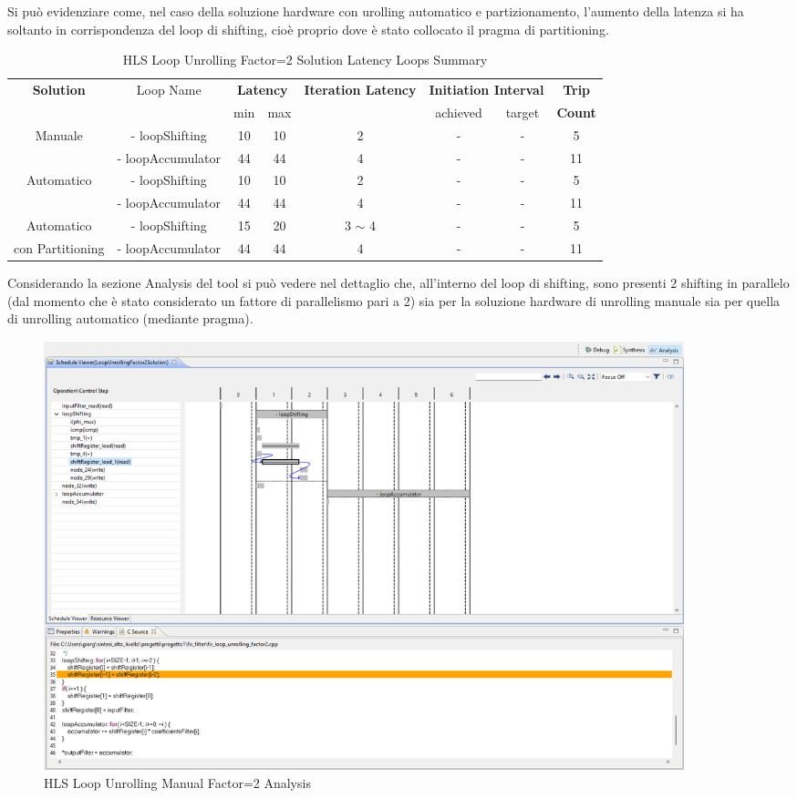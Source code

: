 Si può evidenziare come, nel caso della soluzione hardware con urolling automatico e partizionamento, l'aumento della latenza si ha soltanto in corrispondenza del loop di shifting, cioè proprio dove è stato collocato il pragma di partitioning.

\begin{table}[H]
    \centering
    \begin{tabular}{|c|c|c|c|c|c|c|c|}
        \hline
        \multicolumn{1}{|c|}{\textbf{Solution}} & \multicolumn{1}{|c|}{Loop Name} & \multicolumn{2}{|c|}{\textbf{Latency}} & \multicolumn{1}{c|}{\textbf{Iteration Latency}} & \multicolumn{2}{c|}{\textbf{Initiation Interval}} & \multicolumn{1}{c|}{\textbf{Trip}}  \\
        &  & min & max & & achieved & target & \textbf{Count} \\
        \hline
        Manuale & - loopShifting & 10 & 10 & 2 & - & - & 5 \\
        & - loopAccumulator & 44 & 44 & 4 & - & - & 11 \\
        \hline
        Automatico & - loopShifting & 10 & 10 & 2 & - & - & 5 \\
        & - loopAccumulator & 44 & 44 & 4 & - & - & 11 \\
        \hline
        Automatico  & - loopShifting & 15 & 20 & 3 $\sim$ 4 & - & - & 5 \\
        con Partitioning & - loopAccumulator & 44 & 44 & 4 & - & - & 11 \\
        \hline
    \end{tabular}
    \caption{HLS Loop Unrolling Factor=2 Solution Latency Loops Summary }
    \label{tab:hls-loop-unrolling-factor2-solution-loop-summary}
\end{table}

Considerando la sezione Analysis del tool si può vedere nel dettaglio che, all'interno del loop di shifting, sono presenti 2 shifting in parallelo (dal momento che è stato considerato un fattore di parallelismo pari a 2) sia per la soluzione hardware di unrolling manuale sia per quella di unrolling automatico (mediante pragma).

\begin{figure}[H]
    \centering
    \includegraphics[width=0.9\textwidth]{solutions/loop_unrolling/factor2/loopunrollingmanual2.png}
    \caption{HLS Loop Unrolling Manual Factor=2 Analysis}
\end{figure}


